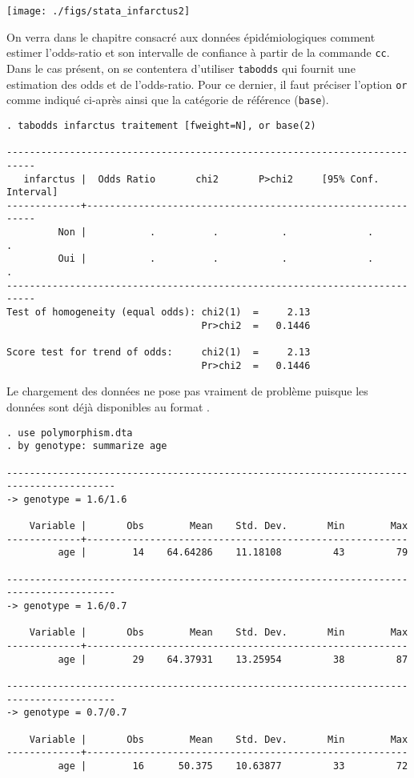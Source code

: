 \texttt{[image: ./figs/stata\_infarctus2]}

On verra dans le chapitre consacré aux données épidémiologiques comment
estimer l'odds-ratio et son intervalle de confiance à partir de la commande
\texttt{cc}. Dans le cas présent, on se contentera d'utiliser
\texttt{tabodds} qui fournit une estimation des odds et de
l'odds-ratio. Pour ce dernier, il faut préciser l'option \texttt{or} comme
indiqué ci-après ainsi que la catégorie de référence (\texttt{base}).
\begin{verbatim}
. tabodds infarctus traitement [fweight=N], or base(2)

---------------------------------------------------------------------------
   infarctus |  Odds Ratio       chi2       P>chi2     [95% Conf. Interval]
-------------+-------------------------------------------------------------
         Non |           .          .           .              .          .
         Oui |           .          .           .              .          .
---------------------------------------------------------------------------
Test of homogeneity (equal odds): chi2(1)  =     2.13
                                  Pr>chi2  =   0.1446

Score test for trend of odds:     chi2(1)  =     2.13
                                  Pr>chi2  =   0.1446
\end{verbatim}
%
%
%
\soln{\ref{exo:9.5}} Le chargement des données ne pose pas vraiment de
problème puisque les données sont déjà disponibles au format \Stata.
\begin{verbatim}
. use polymorphism.dta
. by genotype: summarize age

-----------------------------------------------------------------------------------------
-> genotype = 1.6/1.6

    Variable |       Obs        Mean    Std. Dev.       Min        Max
-------------+--------------------------------------------------------
         age |        14    64.64286    11.18108         43         79

-----------------------------------------------------------------------------------------
-> genotype = 1.6/0.7

    Variable |       Obs        Mean    Std. Dev.       Min        Max
-------------+--------------------------------------------------------
         age |        29    64.37931    13.25954         38         87

-----------------------------------------------------------------------------------------
-> genotype = 0.7/0.7

    Variable |       Obs        Mean    Std. Dev.       Min        Max
-------------+--------------------------------------------------------
         age |        16      50.375    10.63877         33         72
\end{verbatim}

